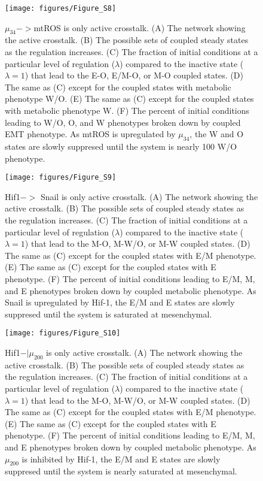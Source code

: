 \documentclass{article}
\begin{document}
\begin{figure}
\texttt{[image: figures/Figure\_S8]}
\caption{$\mu_{34}-> $mtROS is only active crosstalk. (A) The network showing the active crosstalk. (B) The possible sets of coupled steady states as the regulation increases. (C) The fraction of initial conditions at a particular level of regulation ($\lambda$) compared to the inactive state ($\lambda=1$) that lead to the E-O, E/M-O, or M-O coupled states. (D) The same as (C) except for the coupled states with metabolic phenotype W/O. (E) The same as (C) except for the coupled states with metabolic phenotype W. (F) The percent of initial conditions leading to W/O, O, and W phenotypes broken down by coupled EMT phenotype. As mtROS is upregulated by $\mu_{34}$, the W and O states are slowly suppresed until the system is nearly 100 W/O phenotype. }
\end{figure}


\begin{figure}
\texttt{[image: figures/Figure\_S9]}
\caption{Hif1$->$ Snail is only active crosstalk. (A) The network showing the active crosstalk. (B) The possible sets of coupled steady states as the regulation increases. (C) The fraction of initial conditions at a particular level of regulation ($\lambda$) compared to the inactive state ($\lambda=1$) that lead to the M-O, M-W/O, or M-W coupled states. (D) The same as (C) except for the coupled states with E/M phenotype. (E) The same as (C) except for the coupled states with E phenotype. (F) The percent of initial conditions leading to E/M, M, and E phenotypes broken down by coupled metabolic phenotype. As Snail is upregulated by Hif-1, the E/M and E states are slowly suppresed until the system is saturated at mesenchymal. }
\end{figure}

\begin{figure}
\texttt{[image: figures/Figure\_S10]}
\caption{Hif1$-| \mu_{200}$ is only active crosstalk. (A) The network showing the active crosstalk. (B) The possible sets of coupled steady states as the regulation increases. (C) The fraction of initial conditions at a particular level of regulation ($\lambda$) compared to the inactive state ($\lambda=1$) that lead to the M-O, M-W/O, or M-W coupled states. (D) The same as (C) except for the coupled states with E/M phenotype. (E) The same as (C) except for the coupled states with E phenotype. (F) The percent of initial conditions leading to E/M, M, and E phenotypes broken down by coupled metabolic phenotype. As $\mu_{200}$ is inhibited by Hif-1, the E/M and E states are slowly suppresed until the system is nearly saturated at mesenchymal. }
\end{figure}
\end{document}
